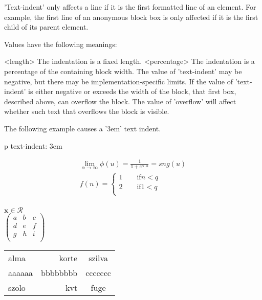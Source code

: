 \documentclass{article}
\begin{document}
'Text-indent' only affects a line if it is the first formatted line of an element. For example, the first line of an anonymous block box is only affected if it is the first child of its parent element.

Values have the following meanings:

<length>
The indentation is a fixed length.
<percentage>
The indentation is a percentage of the containing block width.
The value of 'text-indent' may be negative, but there may be implementation-specific limits. If the value of 'text-indent' is either negative or exceeds the width of the block, that first box, described above, can overflow the block. The value of 'overflow' will affect whether such text that overflows the block is visible.

The following example causes a '3em' text indent.


p { text-indent: 3em }


\begin{eqnarray}
\lim_{\alpha \rightarrow \infty} \phi(u)=\frac{1}{1+e^{\alpha \cdot u}}=sng(u)\\
f(n)=\begin{cases}
1\qquad \text{if}n<q\\
2\qquad \text{if}1<q\\
\end{cases}
\end{eqnarray}\\
$ \mathbf{x} \in \mathcal{R}$
\\
$\begin{pmatrix}
a & b & c\\
d &e&f\\
g&h&i\\
\end{pmatrix}$\\
\begin{tabular}{|l||rc}
alma & korte &szilva\\
aaaaaa& bbbbbbbb& ccccccc\\
\hline
szolo & kvt & fuge
\end{tabular}
\end{document}
